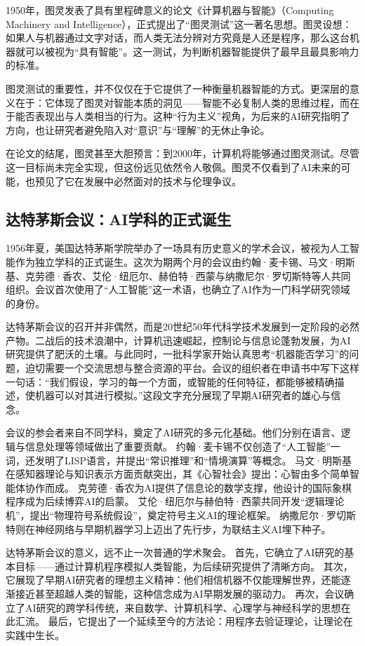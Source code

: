 1950年，图灵发表了具有里程碑意义的论文《计算机器与智能》（Computing Machinery and Intelligence），正式提出了“图灵测试”这一著名思想。图灵设想：如果人与机器通过文字对话，而人类无法分辨对方究竟是人还是程序，那么这台机器就可以被视为“具有智能”。这一测试，为判断机器智能提供了最早且最具影响力的标准。

图灵测试的重要性，并不仅仅在于它提供了一种衡量机器智能的方式。更深层的意义在于：它体现了图灵对智能本质的洞见——智能不必复制人类的思维过程，而在于能否表现出与人类相当的行为。这种“行为主义”视角，为后来的AI研究指明了方向，也让研究者避免陷入对“意识”与“理解”的无休止争论。

在论文的结尾，图灵甚至大胆预言：到2000年，计算机将能够通过图灵测试。尽管这一目标尚未完全实现，但这份远见依然令人敬佩。图灵不仅看到了AI未来的可能，也预见了它在发展中必然面对的技术与伦理争议。

\subsection{达特茅斯会议：AI学科的正式诞生}

1956年夏，美国达特茅斯学院举办了一场具有历史意义的学术会议，被视为人工智能作为独立学科的正式诞生。这次为期两个月的会议由约翰·麦卡锡、马文·明斯基、克劳德·香农、艾伦·纽厄尔、赫伯特·西蒙与纳撒尼尔·罗切斯特等人共同组织。会议首次使用了“人工智能”这一术语，也确立了AI作为一门科学研究领域的身份。

达特茅斯会议的召开并非偶然，而是20世纪50年代科学技术发展到一定阶段的必然产物。二战后的技术浪潮中，计算机迅速崛起，控制论与信息论蓬勃发展，为AI研究提供了肥沃的土壤。与此同时，一批科学家开始认真思考“机器能否学习”的问题，迫切需要一个交流思想与整合资源的平台。会议的组织者在申请书中写下这样一句话：“我们假设，学习的每一个方面，或智能的任何特征，都能够被精确描述，使机器可以对其进行模拟。”这段文字充分展现了早期AI研究者的雄心与信念。

会议的参会者来自不同学科，奠定了AI研究的多元化基础。他们分别在语言、逻辑与信息处理等领域做出了重要贡献。  
约翰·麦卡锡不仅创造了“人工智能”一词，还发明了LISP语言，并提出“常识推理”和“情境演算”等概念。  
马文·明斯基在感知器理论与知识表示方面贡献突出，其《心智社会》提出：心智由多个简单智能体协作而成。  
克劳德·香农为AI提供了信息论的数学支撑，他设计的国际象棋程序成为后续博弈AI的启蒙。  
艾伦·纽厄尔与赫伯特·西蒙共同开发“逻辑理论机”，提出“物理符号系统假设”，奠定符号主义AI的理论框架。  
纳撒尼尔·罗切斯特则在神经网络与早期机器学习上迈出了先行步，为联结主义AI埋下种子。

达特茅斯会议的意义，远不止一次普通的学术聚会。  
首先，它确立了AI研究的基本目标——通过计算机程序模拟人类智能，为后续研究提供了清晰方向。  
其次，它展现了早期AI研究者的理想主义精神：他们相信机器不仅能理解世界，还能逐渐接近甚至超越人类的智能，这种信念成为AI早期发展的驱动力。  
再次，会议确立了AI研究的跨学科传统，来自数学、计算机科学、心理学与神经科学的思想在此汇流。  
最后，它提出了一个延续至今的方法论：用程序去验证理论，让理论在实践中生长。

